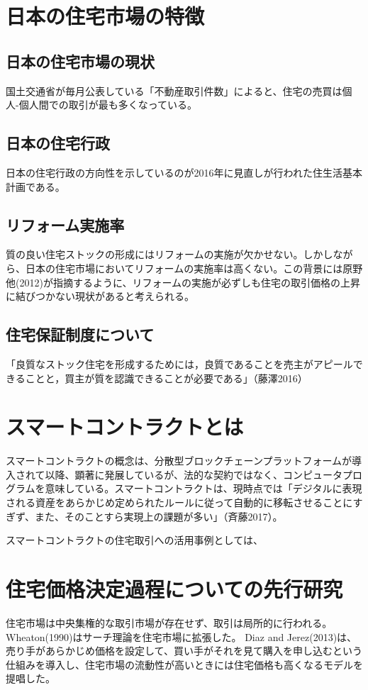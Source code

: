 \documentclass[a4paper,10.5pt]{bxjsarticle}
\begin{document}
\section{日本の住宅市場の特徴}
\subsection{日本の住宅市場の現状}
国土交通省が毎月公表している「不動産取引件数」によると、住宅の売買は個人-個人間での取引が最も多くなっている。

\subsection{日本の住宅行政}
日本の住宅行政の方向性を示しているのが2016年に見直しが行われた住生活基本計画である。

\subsection{リフォーム実施率}
質の良い住宅ストックの形成にはリフォームの実施が欠かせない。しかしながら、日本の住宅市場においてリフォームの実施率は高くない。この背景には原野他(2012)が指摘するように、リフォームの実施が必ずしも住宅の取引価格の上昇に結びつかない現状があると考えられる。

\subsection{住宅保証制度について}

「良質なストック住宅を形成するためには，良質であることを売主がアピールできることと，買主が質を認識できることが必要である」（藤澤2016）

\section{スマートコントラクトとは}
スマートコントラクトの概念は、分散型ブロックチェーンプラットフォームが導入されて以降、顕著に発展しているが、法的な契約ではなく、コンピュータプログラムを意味している。スマートコントラクトは、現時点では「デジタルに表現される資産をあらかじめ定められたルールに従って自動的に移転させることにすぎず、また、そのことすら実現上の課題が多い」（斉藤2017）。

スマートコントラクトの住宅取引への活用事例としては、

\section{住宅価格決定過程についての先行研究}
住宅市場は中央集権的な取引市場が存在せず、取引は局所的に行われる。
Wheaton(1990)はサーチ理論を住宅市場に拡張した。
Diaz and Jerez(2013)は、売り手があらかじめ価格を設定して、買い手がそれを見て購入を申し込むという仕組みを導入し、住宅市場の流動性が高いときには住宅価格も高くなるモデルを提唱した。
\end{document}
